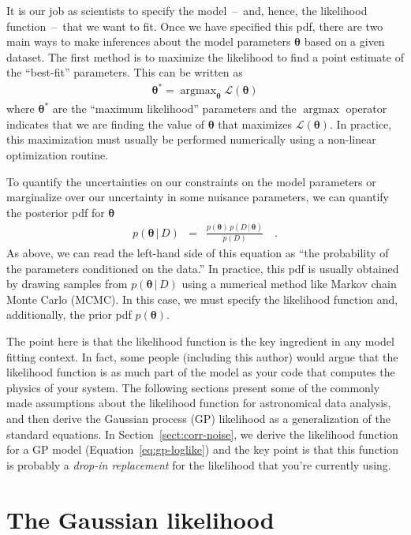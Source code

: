 \documentclass[modern, letterpaper]{aastex61}
\renewcommand{\eqref}[1]{\ref{eq:#1}}
\newcommand{\eqalt}[1]{Equation~\eqref{#1}}
\newcommand{\sectionname}{Section}
\newcommand{\sectref}[1]{\ref{sect:#1}}
\newcommand{\Sect}[1]{\sectionname~\sectref{#1}}
\newcommand{\sect}[1]{\Sect{#1}}
\newcommand{\bvec}[1]{{\ensuremath{\boldsymbol{#1}}}}
\DeclareMathOperator*{\argmax}{argmax}
\begin{document}
It is our job as scientists to specify the model~--~and, hence, the likelihood
function~--~that we want to fit.
Once we have specified this pdf, there are two main ways to make inferences
about the model parameters $\bvec{\theta}$ based on a given dataset.
The first method is to maximize the likelihood to find a point estimate of the
``best-fit'' parameters.
This can be written as
\begin{eqnarray}
\bvec{\theta}^* = \argmax_{\bvec{\theta}} \mathcal{L}(\bvec{\theta})
\end{eqnarray}
where $\bvec{\theta}^*$ are the ``maximum likelihood'' parameters and the
$\argmax$ operator indicates that we are finding the value of $\bvec{\theta}$
that maximizes $\mathcal{L}(\bvec{\theta})$.
In practice, this maximization must usually be performed numerically using a
non-linear optimization routine.

To quantify the uncertainties on our constraints on the model parameters or
marginalize over our uncertainty in some nuisance parameters, we can quantify
the posterior pdf for $\bvec{\theta}$
\begin{eqnarray}
p(\bvec{\theta}\,|\,D) &=&
    \frac{p(\bvec{\theta})\,p(D\,|\,\bvec{\theta})}{p(D)} \quad.
\end{eqnarray}
As above, we can read the left-hand side of this equation as ``the probability
of the parameters conditioned on the data.''
In practice, this pdf is usually obtained by drawing samples from
$p(\bvec{\theta}\,|\,D)$ using a numerical method like Markov chain Monte
Carlo (MCMC).
In this case, we must specify the likelihood function and, additionally, the
prior pdf $p(\bvec{\theta})$.

The point here is that the likelihood function is the key ingredient in any
model fitting context.
In fact, some people (including this author) would argue that the likelihood
function is as much part of the model as your code that computes the physics
of your system.
The following sections present some of the commonly made assumptions about the
likelihood function for astronomical data analysis, and then derive the
Gaussian process (GP) likelihood as a generalization of the standard
equations.
In \sect{corr-noise}, we derive the likelihood function for a GP model
(\eqalt{gp-loglike}) and the key point is that this function is probably a
\emph{drop-in replacement} for the likelihood that you're currently using.

\section{The Gaussian likelihood}
\end{document}
